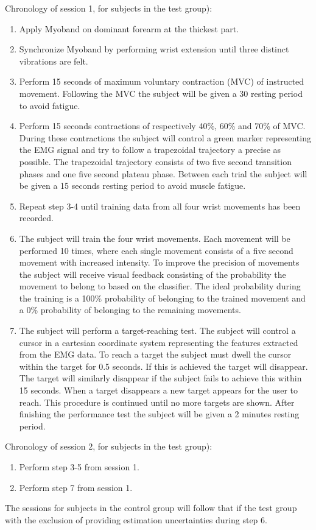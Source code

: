 Chronology of session 1, for subjects in the test group):
\begin{enumerate}
	\item Apply Myoband on dominant forearm at the thickest part.
	\item Synchronize Myoband by performing wrist extension until three distinct vibrations are felt.
	\item Perform 15 seconds of maximum voluntary contraction (MVC) of instructed movement. Following the MVC the subject will be given a 30 resting period to avoid fatigue.
	\item Perform 15 seconds contractions of respectively 40\%, 60\% and 70\% of MVC. During these contractions the subject will control a green marker representing the EMG signal and try to follow a trapezoidal trajectory a precise as possible. The trapezoidal trajectory consists of two five second transition phases and one five second plateau phase. Between each trial the subject will be given a 15 seconds resting period to avoid muscle fatigue.
	\item Repeat step 3-4 until training data from all four wrist movements has been recorded.
	\item The subject will train the four wrist movements. Each movement will be performed 10 times, where each single movement consists of a five second movement with increased intensity. To improve the precision of movements the subject will receive visual feedback consisting of the probability the movement to belong to based on the classifier. The ideal probability during the training is a 100\% probability of belonging to the trained movement and a 0\% probability of belonging to the remaining movements. 
	\item The subject will perform a target-reaching test. The subject will control a cursor in a cartesian coordinate system representing the features extracted from the EMG data. To reach a target the subject must dwell the cursor within the target for 0.5 seconds. If this is achieved the target will disappear. The target will similarly disappear if the subject fails to achieve this within 15 seconds. When a target disappears a new target appears for the user to reach. This procedure is continued until no more targets are shown. After finishing the performance test the subject will be given a 2 minutes resting period.
\end{enumerate}


Chronology of session 2, for subjects in the test group):
\begin{enumerate}
	\item Perform step 3-5 from session 1.
	\item Perform step 7 from session 1. 
\end{enumerate}

The sessions for subjects in the control group will follow that if the test group with the exclusion of providing estimation uncertainties during step 6.

\clearpage







